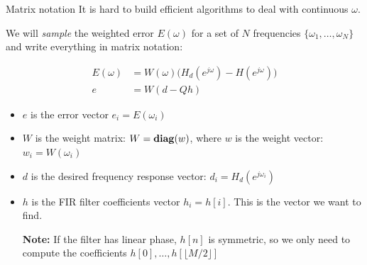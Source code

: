 \documentclass[10pt]{beamer}
\begin{document}
\begin{frame}{Matrix notation}
	It is hard to build efficient algorithms to deal with continuous $\omega$.
	
	We will \textit{sample} the weighted error $E(\omega)$ for a set of $N$ frequencies $\{\omega_1, \ldots, \omega_N\}$ and write everything in matrix notation:
	
	\begin{align*}
		E(\omega) &= W(\omega)\Big(H_d(e^{j\omega}) - H(e^{j\omega})\Big) \tag{continuous weighted error} \\
		e &= W(d - Qh) \tag{matrix notation}
	\end{align*}
	
	\begin{itemize}
		\item $e$ is the error vector $e_i = E(\omega_i)$
		\item $W$ is the weight matrix: $W = \text{\textbf{diag}}(w)$, where $w$ is the weight vector: $w_i = W(\omega_i)$
		\item $d$ is the desired frequency response vector: $d_i =H_d(e^{j\omega_i})$
		\item $h$ is the FIR filter coefficients vector $h_i = h[i]$. This is the vector we want to find. 
		
		\textbf{Note:} If the filter has linear phase, $h[n]$ is symmetric, so we only need to compute the coefficients $h[0], \ldots, h[\lfloor M/2\rfloor]$
	\end{itemize}
\end{frame}
\end{document}
